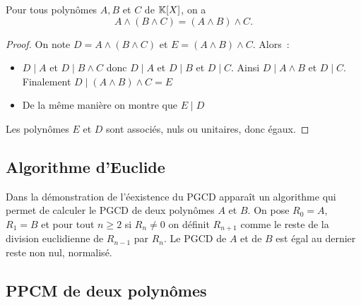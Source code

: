 \begin{prop}[Associativité]
  Pour tous polynômes $A,B$ et $C$ de $\mathbb{K}[X]$, on a
  \begin{equation}
    A \wedge (B\wedge C) = (A\wedge B) \wedge C.
  \end{equation}
\end{prop}
\begin{proof}
  On note $D=A \wedge (B\wedge C)$ et $E=(A\wedge B) \wedge C$. Alors~:
  \begin{itemize}
  \item $D\mid{}A$ et $D\mid{}B \wedge C$ donc $D\mid{}A$ et $D\mid{}B$ et $D\mid{} C$. Ainsi $D\mid{}A \wedge B$ et $D\mid{}C$. Finalement $D\mid{}(A\wedge B) \wedge C=E$
  \item De la même manière on montre que $E\mid{}D$
  \end{itemize}
  Les polynômes $E$ et $D$ sont associés, nuls ou unitaires, donc égaux.
\end{proof}

\subsection{Algorithme d'Euclide}

Dans la démonstration de l'éexistence du PGCD apparaît un algorithme qui permet de calculer le PGCD de deux polynômes $A$ et $B$. On pose $R_0=A$, $R_1=B$ et pour tout $n\geq 2$
 si $R_n \neq 0$ on définit $R_{n+1}$ comme le reste de la division euclidienne de $R_{n-1}$ par $R_n$. Le PGCD de $A$ et de $B$ est égal au dernier reste non nul, normalisé.

\subsection{PPCM de deux polynômes}

